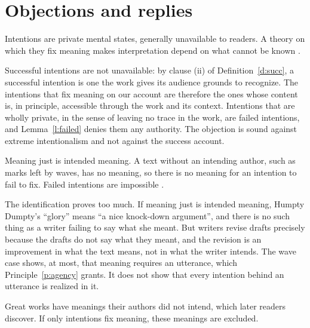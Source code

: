 \documentclass{situationist-preprint}
\begin{document}
\section{Objections and replies}

\begin{objection}\label{o:wb}
Intentions are private mental states, generally unavailable to readers. A theory on which they fix meaning makes interpretation depend on what cannot be known \citep{WimsattBeardsley1946}.
\end{objection}

\begin{reply}
Successful intentions are not unavailable: by clause (ii) of Definition~\ref{d:succ}, a successful intention is one the work gives its audience grounds to recognize. The intentions that fix meaning on our account are therefore the ones whose content is, in principle, accessible through the work and its context. Intentions that are wholly private, in the sense of leaving no trace in the work, are failed intentions, and Lemma~\ref{l:failed} denies them any authority. The objection is sound against extreme intentionalism and not against the success account.
\end{reply}

\begin{objection}\label{o:km}
Meaning just is intended meaning. A text without an intending author, such as marks left by waves, has no meaning, so there is no meaning for an intention to fail to fix. Failed intentions are impossible \citep{KnappMichaels1982}.
\end{objection}

\begin{reply}
The identification proves too much. If meaning just is intended meaning, Humpty Dumpty's \enquote{glory} means \enquote{a nice knock-down argument}, and there is no such thing as a writer failing to say what she meant. But writers revise drafts precisely because the drafts do not say what they meant, and the revision is an improvement in what the text means, not in what the writer intends. The wave case shows, at most, that meaning requires an utterance, which Principle~\ref{p:agency} grants. It does not show that every intention behind an utterance is realized in it.
\end{reply}

\begin{objection}\label{o:more}
Great works have meanings their authors did not intend, which later readers discover. If only intentions fix meaning, these meanings are excluded.
\end{objection}
\end{document}
